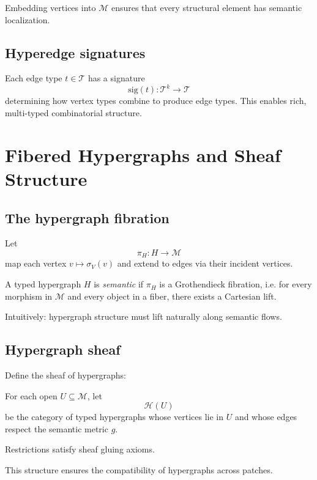 Embedding vertices into $\mathcal{M}$ ensures that every structural element has
semantic localization.

\subsection{Hyperedge signatures}

Each edge type $t\in\mathcal{T}$ has a signature
\[
\mathrm{sig}(t) : \mathcal{T}^k \longrightarrow \mathcal{T}
\]
determining how vertex types combine to produce edge types. This enables rich,
multi-typed combinatorial structure.

\section{Fibered Hypergraphs and Sheaf Structure}

\subsection{The hypergraph fibration}

Let
\[
\pi_H : H \longrightarrow \mathcal{M}
\]
map each vertex $v\mapsto \sigma_V(v)$ and extend to edges via their incident
vertices.

\begin{definition}
A typed hypergraph $H$ is \emph{semantic} if $\pi_H$ is a Grothendieck
fibration, i.e. for every morphism in $\mathcal{M}$ and every object in a
fiber, there exists a Cartesian lift.
\end{definition}

Intuitively: hypergraph structure must lift naturally along semantic flows.

\subsection{Hypergraph sheaf}

Define the sheaf of hypergraphs:

\begin{definition}
For each open $U\subseteq\mathcal{M}$, let
\[
\mathscr{H}(U)
\]
be the category of typed hypergraphs whose vertices lie in $U$ and whose edges
respect the semantic metric $g$.

Restrictions satisfy sheaf gluing axioms.
\end{definition}

This structure ensures the compatibility of hypergraphs across patches.

